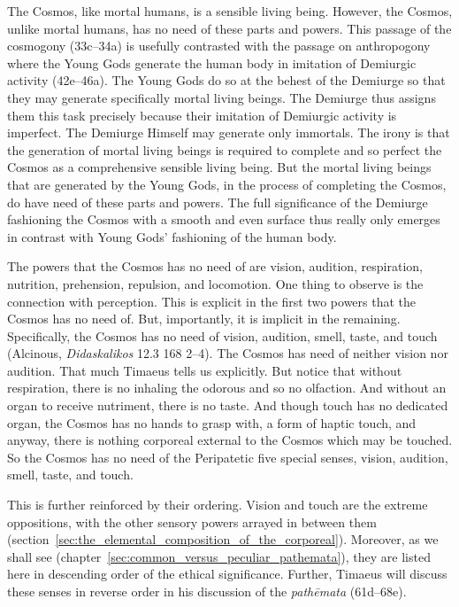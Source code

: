 The Cosmos, like mortal humans, is a sensible living being. However, the Cosmos, unlike mortal humans, has no need of these parts and powers. This passage of the cosmogony (33c--34a) is usefully contrasted with the passage on anthropogony where the Young Gods generate the human body in imitation of Demiurgic activity (42e--46a). The Young Gods do so at the behest of the Demiurge so that they may generate specifically mortal living beings. The Demiurge thus assigns them this task precisely because their imitation of Demiurgic activity is imperfect. The Demiurge Himself may generate only immortals. The irony is that the generation of mortal living beings is required to complete and so perfect the Cosmos as a comprehensive sensible living being. But the mortal living beings that are generated by the Young Gods, in the process of completing the Cosmos, do have need of these parts and powers. The full significance of the Demiurge fashioning the Cosmos with a smooth and even surface thus really only emerges in contrast with Young Gods' fashioning of the human body. 

The powers that the Cosmos has no need of are vision, audition, respiration, nutrition, prehension, repulsion, and locomotion. One thing to observe is the connection with perception. This is explicit in the first two powers that the Cosmos has no need of. But, importantly, it is implicit in the remaining. Specifically, the Cosmos has no need of vision, audition, smell, taste, and touch (Alcinous, \emph{Didaskalikos} 12.3 168 2--4). The Cosmos has need of neither vision nor audition. That much Timaeus tells us explicitly. But notice that without respiration, there is no inhaling the odorous and so no olfaction. And without an organ to receive nutriment, there is no taste. And though touch has no dedicated organ, the Cosmos has no hands to grasp with, a form of haptic touch, and anyway, there is nothing corporeal external to the Cosmos which may be touched. So the Cosmos has no need of the Peripatetic five special senses, vision, audition, smell, taste, and touch. 

This is further reinforced by their ordering. Vision and touch are the extreme oppositions, with the other sensory powers arrayed in between them (section~\ref{sec:the_elemental_composition_of_the_corporeal}). Moreover, as we shall see (chapter~\ref{sec:common_versus_peculiar_pathemata}), they are listed here in descending order of the ethical significance. Further, Timaeus will discuss these senses in reverse order in his discussion of the \emph{pathēmata} (61d--68e). 

